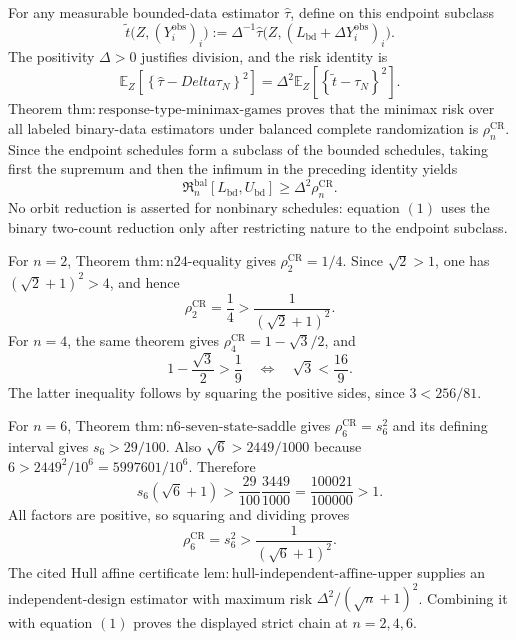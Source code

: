For any measurable bounded-data estimator \(\widehat\tau\), define on this endpoint subclass
\[
 \widetilde t\bigl(Z,(Y_i^{\mathrm{obs}})_i\bigr)
 :=\Delta^{-1}\widehat\tau
 \bigl(Z,(L_{\mathrm{bd}}+\Delta Y_i^{\mathrm{obs}})_i\bigr).
\]
The positivity \(\Delta>0\) justifies division, and the risk identity is
\[
 \mathbb E_Z\left[\left\{\widehat\tau-Delta\tau_N\right\}^2\right]
 =\Delta^2\mathbb E_Z\left[\left\{\widetilde t-\tau_N\right\}^2\right].
\]
Theorem \(\mathrm{thm{:}response\mbox{-}type\mbox{-}minimax\mbox{-}games}\) proves that the minimax risk over all labeled binary-data estimators under balanced complete randomization is \(\rho_n^{\mathrm{CR}}\).  Since the endpoint schedules form a subclass of the bounded schedules, taking first the supremum and then the infimum in the preceding identity yields
\[
 \mathfrak R_n^{\mathrm{bal}}[L_{\mathrm{bd}},U_{\mathrm{bd}}]
 \geq\Delta^2\rho_n^{\mathrm{CR}}. \tag{1}
\]
No orbit reduction is asserted for nonbinary schedules: equation \((1)\) uses the binary two-count reduction only after restricting nature to the endpoint subclass.

For \(n=2\), Theorem \(\mathrm{thm{:}n24\mbox{-}equality}\) gives \(\rho_2^{\mathrm{CR}}=1/4\).  Since \(\sqrt2>1\), one has \((\sqrt2+1)^2>4\), and hence
\[
 \rho_2^{\mathrm{CR}}=\frac14>\frac1{(\sqrt2+1)^2}.
\]
For \(n=4\), the same theorem gives \(\rho_4^{\mathrm{CR}}=1-\sqrt3/2\), and
\[
 1-\frac{\sqrt3}{2}>\frac19
 \quad\Longleftrightarrow\quad
 \sqrt3<\frac{16}{9}.
\]
The latter inequality follows by squaring the positive sides, since \(3<256/81\).

For \(n=6\), Theorem \(\mathrm{thm{:}n6\mbox{-}seven\mbox{-}state\mbox{-}saddle}\) gives \(\rho_6^{\mathrm{CR}}=s_6^2\) and its defining interval gives \(s_6>29/100\).  Also
\(
 \sqrt6>2449/1000
\)
because \(6>2449^2/10^6=5997601/10^6\).  Therefore
\[
 s_6(\sqrt6+1)>
 \frac{29}{100}\frac{3449}{1000}
 =\frac{100021}{100000}>1.
\]
All factors are positive, so squaring and dividing proves
\[
 \rho_6^{\mathrm{CR}}=s_6^2>\frac1{(\sqrt6+1)^2}.
\]
The cited Hull affine certificate \(\mathrm{lem{:}hull\mbox{-}independent\mbox{-}affine\mbox{-}upper}\) supplies an independent-design estimator with maximum risk \(\Delta^2/(\sqrt n+1)^2\).  Combining it with equation \((1)\) proves the displayed strict chain at \(n=2,4,6\).

